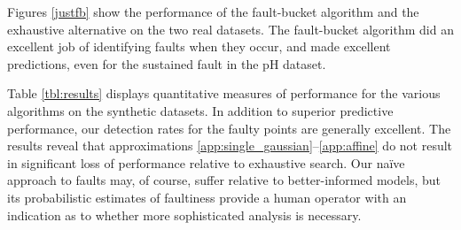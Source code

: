 \documentclass[twoside]{article}
\begin{document}


Figures \ref{justfb} show the performance of the
fault-bucket algorithm and the exhaustive alternative on the two real datasets. The fault-bucket algorithm did an excellent
job of identifying faults when they occur, and made excellent
predictions, even for the sustained fault in the pH dataset. 

Table \ref{tbl:results} displays quantitative measures of performance
for the various algorithms on the synthetic
datasets.  
In addition to superior predictive performance, our
detection rates for the faulty points are generally excellent. The results reveal that approximations \ref{app:single_gaussian}--\ref{app:affine} do not result in significant loss of performance relative to exhaustive search. Our na\"{i}ve approach to faults may, of course, suffer relative to better-informed models, but its probabilistic estimates of faultiness provide a human operator with an indication as to whether more sophisticated analysis is necessary.
\end{document}
